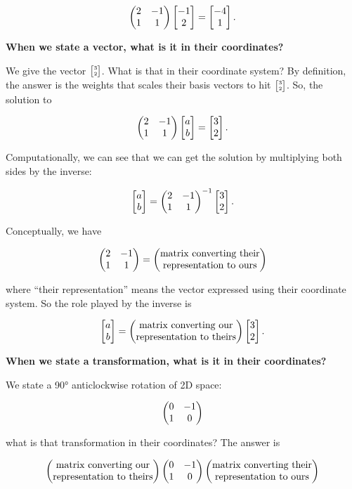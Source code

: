 $$
\begin{pmatrix}2 & -1\\1 &  1\\ \end{pmatrix} \begin{bmatrix}-1\\2\end{bmatrix} = \begin{bmatrix}-4\\1\end{bmatrix}.
$$


\textbf{When we state a vector, what is it in their coordinates?}

We give the vector $\tiny{\begin{bmatrix}3\\2\end{bmatrix}}$. What is that in their coordinate system? By
definition, the answer is the weights that scales their basis vectors to hit
$\tiny{\begin{bmatrix}3\\2\end{bmatrix}}$. So, the solution to

$$
\begin{pmatrix}2 & -1\\1 & 1\\ \end{pmatrix} \begin{bmatrix}a\\b\end{bmatrix} = \begin{bmatrix}3\\2\end{bmatrix}.
$$


Computationally, we can see that we can get the solution by multiplying both
sides by the inverse:

$$
\begin{bmatrix}a\\b\end{bmatrix} = \begin{pmatrix}2 & -1\\1 & 1\\ \end{pmatrix}^{-1} \begin{bmatrix}3\\2\end{bmatrix}.
$$

Conceptually, we have

$$
\begin{pmatrix}2 & -1\\1 & 1\\ \end{pmatrix} =
\begin{pmatrix}\text{matrix converting their}\\\text{representation to ours} \\ \end{pmatrix}
$$

where ``their representation'' means the vector expressed using their coordinate
system. So the role played by the inverse is

$$
\begin{bmatrix}a\\b\end{bmatrix} =
\begin{pmatrix}\text{matrix converting our}\\\text{representation to theirs} \\ \end{pmatrix}
\begin{bmatrix}3\\2\end{bmatrix}.
$$

\textbf{When we state a transformation, what is it in their coordinates?}

We state a 90° anticlockwise rotation of 2D space:

$$
\begin{pmatrix}0 & -1\\1 & 0\\ \end{pmatrix}
$$

what is that transformation in their coordinates? The answer is

$$
\begin{pmatrix}\text{matrix converting our}\\\text{representation to theirs} \\ \end{pmatrix}
\begin{pmatrix}0 & -1\\1 & 0\\ \end{pmatrix}
\begin{pmatrix}\text{matrix converting their}\\\text{representation to ours} \\ \end{pmatrix}
$$

